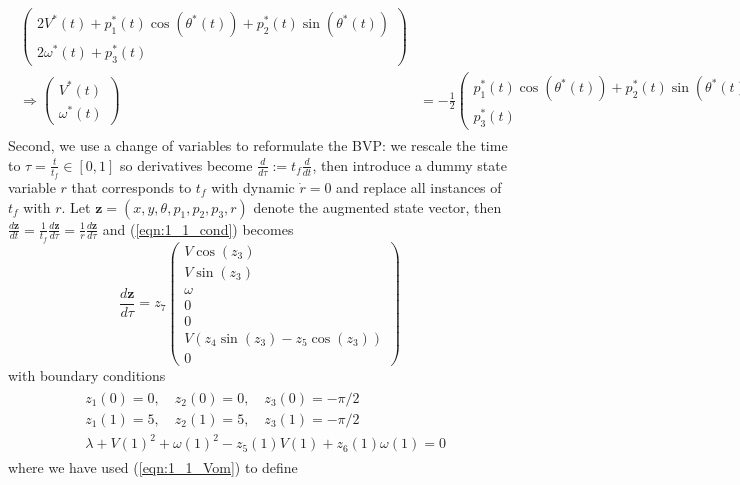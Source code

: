 \documentclass[12pt]{article}
\begin{document}
\begin{enumerate}
\begin{align}
\begin{split}
		\left(\begin{array}{c}
		2V^*(t) + p_1^*(t)\cos(\theta^*(t)) + p_2^*(t)\sin(\theta^*(t)) \\
		2\omega^*(t) + p_3^*(t)
		\end{array}\right) \\
		\Rightarrow \left(\begin{array}{c}
		V^*(t) \\
		\omega^*(t)
		\end{array}\right) &=
		-\frac{1}{2}\left(\begin{array}{c}
		p_1^*(t)\cos(\theta^*(t)) + p_2^*(t)\sin(\theta^*(t)) \\
		p_3^*(t)
		\end{array}\right)
	\end{split}
	\end{align}
	Second, we use a change of variables to reformulate the BVP: we rescale the time to $\tau = \frac{t}{t_f} \in [0,1]$ so derivatives become $\frac{d}{d\tau} := t_f\frac{d}{dt}$, then introduce a dummy state variable $r$ that corresponds to $t_f$ with dynamic $\dot r = 0$ and replace all instances of $t_f$ with $r$. Let $\mathbf{z} = (x, y, \theta, p_1, p_2, p_3, r)$ denote the augmented state vector, then $\frac{d\mathbf{z}}{dt} = \frac{1}{t_f}\frac{d\mathbf{z}}{d\tau} = \frac{1}{r}\frac{d\mathbf{z}}{d\tau}$ and (\ref{eqn:1_1_cond}) becomes
	\begin{equation}\label{eqn:1_1_bvp_opt}
		\frac{d\mathbf{z}}{d\tau} =
		z_7\left(\begin{array}{c}
		V\cos(z_3) \\
		V\sin(z_3) \\
		\omega \\
		0 \\
		0 \\
		V(z_4\sin(z_3) - z_5\cos(z_3)) \\
		0
		\end{array}\right)
	\end{equation}
	with boundary conditions
	\begin{align}\label{eqn:1_1_bvp_bc}
	\begin{split}
		&z_1(0) = 0, \quad z_2(0) = 0, \quad z_3(0) = -\pi/2 \\
		&z_1(1) = 5, \quad z_2(1) = 5, \quad z_3(1) = -\pi/2 \\
		&\lambda + V(1)^2 + \omega(1)^2 - z_5(1)V(1) + z_6(1)\omega(1) = 0
	\end{split}
	\end{align}
	where we have used (\ref{eqn:1_1_Vom}) to define

\end{enumerate}
\end{document}
